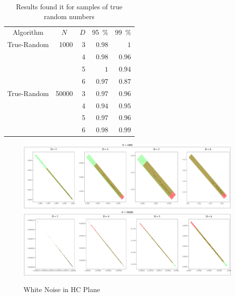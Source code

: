 \begin{table}[H]
	\centering
	\caption{Results found it for samples of true random numbers}
	\label{tab:result1}
	\begin{tabular}{c*{3}rr}
		\toprule
		Algorithm & \multicolumn{1}{c}{$N$} & \multicolumn{1}{c}{$D$} & \multicolumn{1}{c}{\SI{95}{\percent}} & \multicolumn{1}{c}{\SI{99}{\percent}}\\
		\cmidrule(lr){1-1}
		\cmidrule(lr){2-2}
		\cmidrule(lr){3-3}
		\cmidrule(lr){4-4}
		\cmidrule(lr){5-5}
		True-Random & 1000 & 3 & $0.98$ & $1$\\
		&  & 4 & $0.98$ & $0.96$\\
		&  & 5 & $1$ & $0.94$\\
		&  & 6 & $0.97$ & $0.87$\\
		\cmidrule(lr){1-5}
		True-Random & 50000 & 3 & $0.97$ & $0.96$\\
		&  & 4 & $0.94$ & $0.95$\\
		&  & 5 & $0.97$ & $0.96$\\
		&  & 6 & $0.98$ & $0.99$\\
		\bottomrule
	\end{tabular}
\end{table}

\begin{figure}[H]
    \centering
    \includegraphics[width=\linewidth]{Figures/RNG-1000.pdf}
    \includegraphics[width=\linewidth]{Figures/RNG-50000.pdf}
    \caption{White Noise in HC Plane}
    \label{fig:RNG}
\end{figure}

